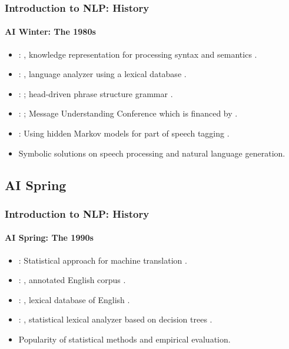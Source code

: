 \documentclass[xcolor=table]{beamer}
\begin{document}
\begin{frame}
\frametitle{Introduction to NLP: History}
\framesubtitle{AI Winter: The 1980s}

\begin{itemize}
	\item {}: , knowledge representation for processing syntax and semantics \cite{1980-bobrow}.
	\item {}: , language analyzer using a lexical database \cite{1986-jacobs}.
	\item {}: ; head-driven phrase structure grammar \cite{1987-sag-pollard}.
	\item {}: ; Message Understanding Conference which is financed by .
	\item {}: Using hidden Markov models for part of speech tagging \cite{1988-church}.
	\item Symbolic solutions on speech processing and natural language generation.
\end{itemize}

\end{frame}

\subsection{AI Spring}

\begin{frame}
\frametitle{Introduction to NLP: History}
\framesubtitle{AI Spring: The 1990s}

\begin{itemize}
	\item {}: Statistical approach for machine translation \cite{1990-brown-al}.
	\item {}: , annotated English corpus \cite{1993-marcus-al}.
	\item {}: , lexical database of English \cite{1995-miller}.
	\item {}: , statistical lexical analyzer based on decision trees \cite{1996-magerman}.
	\item Popularity of statistical methods and empirical evaluation.
\end{itemize}

\end{frame}
\end{document}
